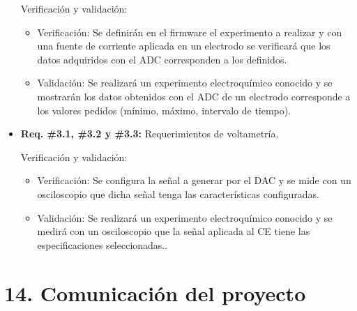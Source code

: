 \documentclass[11pt]{charter}
\begin{document}
\begin{itemize}
Verificación y validación:
\begin{itemize}
\item Verificación: Se definirán en el firmware el experimento a realizar y con una fuente de corriente aplicada en un electrodo se verificará que los datos adquiridos con el ADC corresponden a los definidos.
\item Validación: Se realizará un experimento electroquímico conocido y se mostrarán los datos obtenidos con el ADC de un electrodo corresponde a los valores pedidos (mínimo, máximo, intervalo de tiempo).
\end{itemize}

\item \textbf{Req. \#3.1, \#3.2 y \#3.3:} Requerimientos de voltametría.

Verificación y validación:
\begin{itemize}
\item Verificación: Se configura la señal a generar por el DAC y se mide con un osciloscopio que dicha señal tenga las características configuradas.
\item Validación: Se realizará un experimento electroquímico conocido y se medirá con un osciloscopio que la señal aplicada al CE tiene las especificaciones seleccionadas..
\end{itemize}

\end{itemize}


\section{14. Comunicación del proyecto}
\label{sec:comunicaciones}
\end{document}
